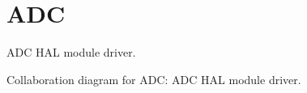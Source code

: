 \hypertarget{group__ADC}{}\section{A\+DC}
\label{group__ADC}


A\+DC H\+AL module driver.  


Collaboration diagram for A\+DC\+:
A\+DC H\+AL module driver. 

